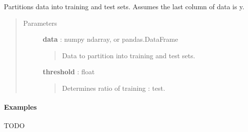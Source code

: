 \documentclass[letterpaper,10pt,english]{sphinxmanual}
\begin{document}
\begin{fulllineitems}
\label{qikify:qikify.helpers.partition}
Partitions data into training and test sets. Assumes the last column of
data is y.
\begin{quote}\begin{description}
\item[{Parameters }] \leavevmode
\textbf{data} : numpy ndarray, or pandas.DataFrame
\begin{quote}

Data to partition into training and test sets.
\end{quote}

\textbf{threshold} : float
\begin{quote}

Determines ratio of training : test.
\end{quote}

\end{description}\end{quote}
\paragraph{Examples}

TODO

\end{fulllineitems}

\end{document}
